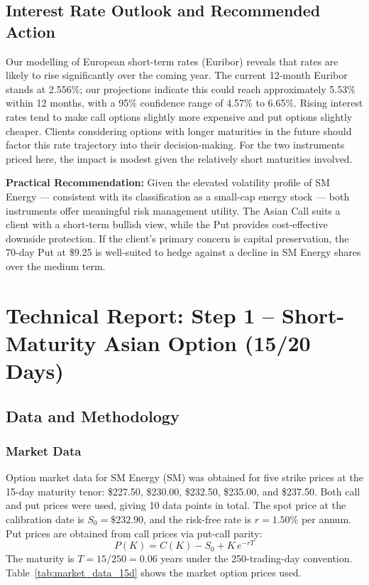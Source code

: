 \documentclass[12pt,a4paper]{article}
\begin{document}
\subsection*{Interest Rate Outlook and Recommended Action}

Our modelling of European short-term rates (Euribor) reveals that rates are likely to rise significantly over the coming year. The current 12-month Euribor stands at 2.556\%; our projections indicate this could reach approximately 5.53\% within 12 months, with a 95\% confidence range of 4.57\% to 6.65\%. Rising interest rates tend to make call options slightly more expensive and put options slightly cheaper. Clients considering options with longer maturities in the future should factor this rate trajectory into their decision-making. For the two instruments priced here, the impact is modest given the relatively short maturities involved.

\textbf{Practical Recommendation:} Given the elevated volatility profile of SM Energy --- consistent with its classification as a small-cap energy stock --- both instruments offer meaningful risk management utility. The Asian Call suits a client with a short-term bullish view, while the Put provides cost-effective downside protection. If the client's primary concern is capital preservation, the 70-day Put at \$9.25 is well-suited to hedge against a decline in SM Energy shares over the medium term.

\newpage
\section{Technical Report: Step 1 -- Short-Maturity Asian Option (15/20 Days)}

\subsection{Data and Methodology}

\subsubsection{Market Data}

Option market data for SM Energy (SM) was obtained for five strike prices at the 15-day maturity tenor: \$227.50, \$230.00, \$232.50, \$235.00, and \$237.50. Both call and put prices were used, giving 10 data points in total. The spot price at the calibration date is $S_0 = \$232.90$, and the risk-free rate is $r = 1.50\%$ per annum. Put prices are obtained from call prices via put-call parity:
\[
  P(K) = C(K) - S_0 + K\,e^{-rT}
\]
The maturity is $T = 15/250 = 0.06$ years under the 250-trading-day convention. Table~\ref{tab:market_data_15d} shows the market option prices used.
\end{document}
